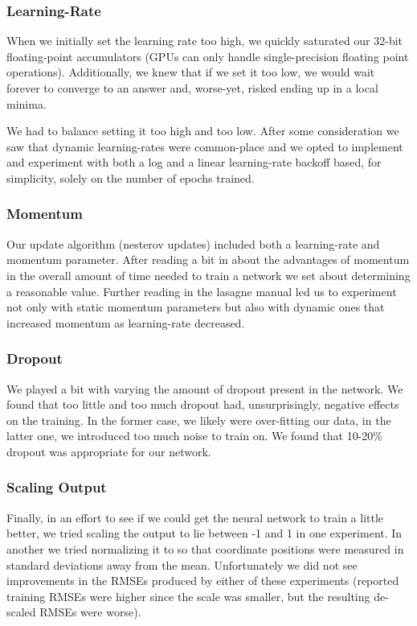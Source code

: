 \documentclass[journal]{IEEEtran}
\begin{document}
\subsubsection{Learning-Rate}
When we initially set the learning rate too high, we quickly saturated our 32-bit floating-point accumulators (GPUs can only handle single-precision floating point operations). Additionally, we knew that if we set it too low, we would wait forever to converge to an answer and, worse-yet, risked ending up in a local minima.

We had to balance setting it too high and too low.  After some consideration we saw that dynamic learning-rates were common-place \cite{gorr,dnouri} and we opted to implement and experiment with both a log and a linear learning-rate backoff based, for simplicity, solely on the number of epochs trained.

\subsubsection{Momentum}
Our update algorithm (nesterov updates) included both a learning-rate and momentum parameter.  After reading a bit in \cite{gorr} about the advantages of momentum in the overall amount of time needed to train a network we set about determining a reasonable value.  Further reading in the lasagne manual \cite{lasagnenesterov} led us to experiment not only with static momentum parameters but also with dynamic ones that increased momentum as learning-rate decreased.

\subsubsection{Dropout}
We played a bit with varying the amount of dropout present in the network.  We found that too little and too much dropout had, unsurprisingly, negative effects on the training.  In the former case, we likely were over-fitting our data, in the latter one, we introduced too much noise to train on.  We found that 10-20\% dropout was appropriate for our network.

\subsubsection{Scaling Output}
Finally, in an effort to see if we could get the neural network to train a little better, we tried scaling the output to lie between -1 and 1 in one experiment.  In another we tried normalizing it to so that coordinate positions were measured in standard deviations away from the mean.  Unfortunately we did not see improvements in the RMSEs produced by either of these experiments (reported training RMSEs were higher since the scale was smaller, but the resulting de-scaled RMSEs were worse).
\end{document}

